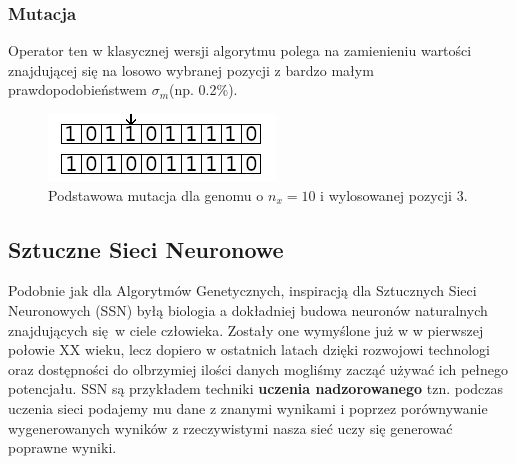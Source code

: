 \documentclass{article}
\begin{document}
\subsubsection{Mutacja}
Operator ten w klasycznej wersji algorytmu polega na zamienieniu wartości znajdującej się na 
losowo wybranej pozycji z bardzo małym prawdopodobieństwem $\sigma_m$(np. 0.2\%).
\begin{figure}[H]
\centering
\includegraphics[scale=1.0]{mutation.png}
\caption{Podstawowa mutacja dla genomu o $n_x = 10$ i wylosowanej pozycji 3.}
\end{figure}



\subsection{Sztuczne Sieci Neuronowe}
Podobnie jak dla Algorytmów Genetycznych, inspiracją dla Sztucznych Sieci Neuronowych (SSN) 
byłą biologia a dokładniej budowa neuronów naturalnych znajdujących się w ciele człowieka.
Zostały one wymyślone już w w pierwszej połowie XX wieku, lecz dopiero w ostatnich latach
dzięki rozwojowi technologi oraz dostępności do olbrzymiej ilości danych mogliśmy zacząć używać
ich pełnego potencjału. SSN są przykładem techniki \textbf{uczenia nadzorowanego} tzn.
podczas uczenia sieci podajemy mu dane z znanymi wynikami i poprzez porównywanie wygenerowanych
wyników z rzeczywistymi nasza sieć uczy się generować poprawne wyniki.
\end{document}
